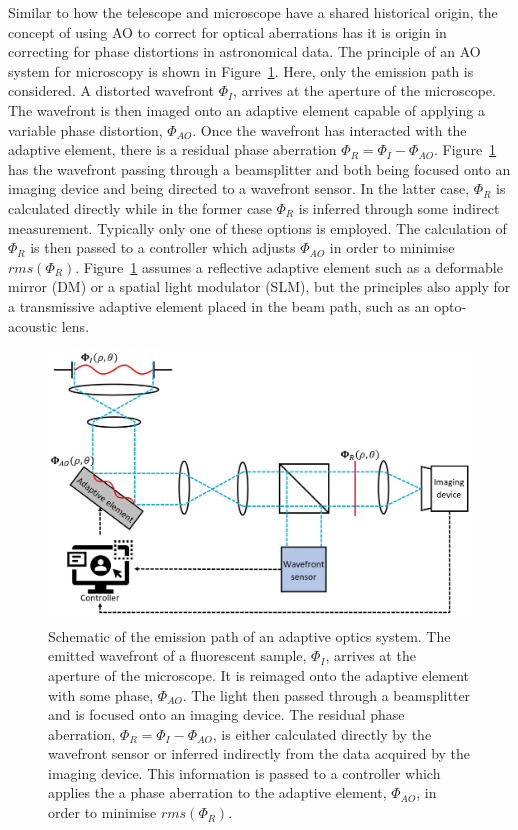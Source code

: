 Similar to how the telescope and microscope have a shared historical origin,
the concept of using AO to correct for optical aberrations has it is 
origin in correcting for phase distortions in astronomical data\cite{babcock1990adaptive}.
The principle of an AO system for microscopy is shown in 
Figure~\ref{fig:ao_system_schematic_simple}. Here, only the emission path 
is considered. A distorted wavefront $\Phi_{I}$, arrives at the aperture 
of the microscope. The wavefront is then imaged onto an adaptive element 
capable of applying a variable phase distortion, $\Phi_{AO}$. Once the 
wavefront has interacted with the adaptive element, there is a residual 
phase aberration $\Phi_{R} = \Phi_{I} - \Phi_{AO}$. 
Figure~\ref{fig:ao_system_schematic_simple} has the wavefront passing through
a beamsplitter and both being focused onto an imaging device and being 
directed to a wavefront sensor. In the latter case, $\Phi_{R}$ is 
calculated directly while in the former case $\Phi_{R}$ is inferred through 
some indirect measurement. Typically only one of these options is employed. 
The calculation of $\Phi_{R}$ is then passed to a controller which adjusts 
$\Phi_{AO}$ in order to minimise $rms(\Phi_{R})$. 
Figure~\ref{fig:ao_system_schematic_simple} assumes a reflective adaptive 
element such as a deformable mirror (DM) or a spatial light modulator (SLM), 
but the principles also apply for a transmissive adaptive element placed 
in the beam path, such as an opto-acoustic lens.

\begin{figure}[h]
	\centering
	\includegraphics[width=\textwidth]{images/ao_system_schematic_simple.jpg}
	\caption[Schematic of the emission path of an adaptive optics system.]{Schematic of the emission path of an adaptive optics system. The emitted wavefront of a fluorescent sample, $\Phi_{I}$, arrives at the aperture of the microscope. It is reimaged onto the adaptive element with some phase, $\Phi_{AO}$. The light then passed through a beamsplitter and is focused onto an imaging device. The residual phase aberration, $\Phi_{R} = \Phi_{I} - \Phi_{AO}$, is either calculated directly by the wavefront sensor or inferred indirectly from the data acquired by the imaging device. This information is passed to a controller which applies the a phase aberration to the adaptive element, $\Phi_{AO}$, in order to minimise $rms(\Phi_{R})$.}
	\label{fig:ao_system_schematic_simple}
\end{figure}

